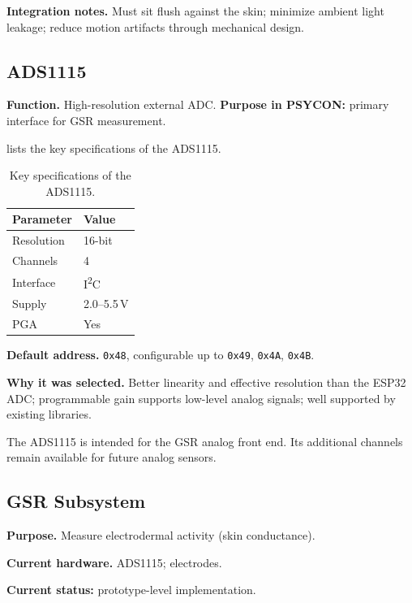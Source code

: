 \textbf{Integration notes.} Must sit flush against the skin; minimize ambient light leakage; reduce motion artifacts through mechanical design.

\subsection{ADS1115}
\label{sec:ads1115}

\textbf{Function.} High-resolution external ADC. \textbf{Purpose in PSYCON:} primary interface for GSR measurement.

 lists the key specifications of the ADS1115.

\begin{table}[H]
\centering
\caption{Key specifications of the ADS1115.}
\label{tab:ads1115-specs}
\small
\begin{tabularx}{\columnwidth}{@{}l Y@{}}
\toprule
\textbf{Parameter} & \textbf{Value} \\
\midrule
Resolution & 16-bit \\
Channels & 4 \\
Interface & I\textsuperscript{2}C \\
Supply & 2.0--5.5\,V \\
PGA & Yes \\
\bottomrule
\end{tabularx}
\end{table}

\textbf{Default address.} \texttt{0x48}, configurable up to \texttt{0x49}, \texttt{0x4A}, \texttt{0x4B}.

\textbf{Why it was selected.} Better linearity and effective resolution than the ESP32 ADC; programmable gain supports low-level analog signals; well supported by existing libraries.

\begin{designnote}
The ADS1115 is intended for the GSR analog front end. Its additional channels remain available for future analog sensors.
\end{designnote}

\subsection{GSR Subsystem}
\label{sec:gsr-subsystem}

\textbf{Purpose.} Measure electrodermal activity (skin conductance).

\textbf{Current hardware.} ADS1115; electrodes.

\begin{requirementbox}
\textbf{Current status:} prototype-level implementation.
\end{requirementbox}

